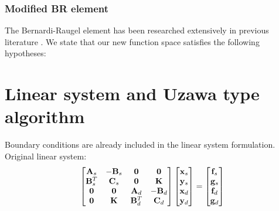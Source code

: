 \newpage

\subsubsection{Modified BR element}

The Bernardi-Raugel element has been researched extensively in previous 
literature \cite{AnalysisFiniteElemStokes_Bernardi_Raugel}. 
We state that our new function space satisfies the following hypotheses:




\newpage

\section{Linear system and Uzawa type algorithm}

Boundary conditions are already included in the linear system formulation.
Original linear system:
\begin{equation}
\begin{bmatrix}
\bold{A}_s   & -\bold{B}_s & \bold{0}     &  \bold{0}   \\
\bold{B}_s^T &  \bold{C}_s & \bold{0}     &  \bold{K}   \\
\bold{0}     &  \bold{0}   & \bold{A}_d   & -\bold{B}_d \\
\bold{0}     &  \bold{K}   & \bold{B}_d^T &  \bold{C}_d
\end{bmatrix} \begin{bmatrix}
\bold{x}_s\\
\bold{y}_s\\
\bold{x}_d\\
\bold{y}_d
\end{bmatrix}= 
\begin{bmatrix}
\bold{f}_s\\
\bold{g}_s\\
\bold{f}_d\\
\bold{g}_d
\end{bmatrix}
\end{equation}

